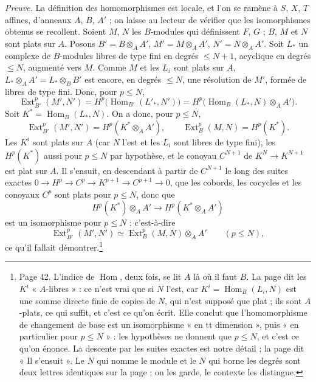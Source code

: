 \documentclass[11pt,a4paper]{article}
\begin{document}
\emph{Preuve.} La définition des homomorphismes est locale, et l'on se
ramène à $S$, $X$, $T$ affines, d'anneaux $A$, $B$, $A'$ ; on laisse au
lecteur de vérifier que les isomorphismes obtenus se recollent. Soient $M$,
$N$ les $B$-modules qui définissent $F$, $G$ ; $B$, $M$ et $N$ sont plats
sur $A$. Posons $B' = B \otimes_A A'$, $M' = M \otimes_A A'$,
$N' = N \otimes_A A'$. Soit $L_{*}$ un complexe de $B$-modules libres de type
fini en degrés $\leq N + 1$, acyclique en degrés $\leq N$, augmenté vers
$M$. Comme $M$ et les $L_i$ sont plats sur $A$, $L_{*} \otimes_A A'
= L_{*} \otimes_B B'$ est encore, en degrés $\leq N$, une résolution de
$M'$, formée de libres de type fini. Donc, pour $p \leq N$,
\[
  \operatorname{Ext}^{p}_{B'}(M', N') = H^{p}\bigl(\operatorname{Hom}_{B'}(L'_{*},
  N')\bigr) = H^{p}\bigl(\operatorname{Hom}_{B}(L_{*}, N) \otimes_A A'\bigr).
\]
Soit $K^{*} = \operatorname{Hom}_{B}(L_{*}, N)$. On a donc, pour $p \leq N$,
\[
  \operatorname{Ext}^{p}_{B'}(M', N') = H^{p}(K^{*} \otimes_A A'), \qquad
  \operatorname{Ext}^{p}_{B}(M, N) = H^{p}(K^{*}).
\]
Les $K^{i}$ sont plats sur $A$ (car $N$ l'est et les $L_i$ sont libres de
type fini), les $H^{p}(K^{*})$ aussi pour $p \leq N$ par hypothèse, et le
conoyau $C^{N+1}$ de $K^{N} \to K^{N+1}$ est plat sur $A$. Il s'ensuit, en
descendant à partir de $C^{N+1}$ le long des suites exactes
$0 \to H^{p} \to C^{p} \to K^{p+1} \to C^{p+1} \to 0$, que les cobords, les
cocycles et les conoyaux $C^{p}$ sont plats pour $p \leq N$, donc que
\[
  H^{p}(K^{*}) \otimes_A A' \longrightarrow H^{p}(K^{*} \otimes_A A')
\]
est un isomorphisme pour $p \leq N$ ; c'est-à-dire
\[
  \operatorname{Ext}^{p}_{B'}(M', N') \simeq \operatorname{Ext}^{p}_{B}(M, N)
  \otimes_A A' \qquad (p \leq N),
\]
ce qu'il fallait démontrer.\footnote{Page 42. L'indice de $\operatorname{Hom}$, deux fois, se lit $A$
là où il faut $B$. La page dit les $K^{i}$ « $A$-libres » : ce n'est vrai
que si $N$ l'est, car $K^{i} = \operatorname{Hom}_{B}(L_i, N)$ est une
somme directe finie de copies de $N$, qui n'est supposé que plat ; ils sont
$A$-plats, ce qui suffit, et c'est ce qu'on écrit. Elle conclut que
l'homomorphisme de changement de base est un isomorphisme « en tt
dimension », puis « en particulier pour $p \leq N$ » : les hypothèses ne
donnent que $p \leq N$, et c'est ce qu'on énonce. La descente par les suites
exactes est notre détail ; la page dit « Il s'ensuit ». Le $N$ qui nomme le
module et le $N$ qui borne les degrés sont deux lettres identiques sur la
page ; on les garde, le contexte les distingue.}
\end{document}
